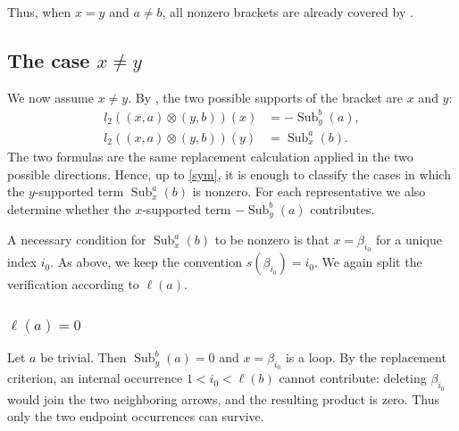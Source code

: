 \documentclass[11pt,a4paper,reqno]{amsart}
\newcommand{\Sub}{\operatorname{Sub}}
\newcommand{\para}[2]{(#1,#2)}
\newcommand{\bi}{\beta_{i_0}}
\theoremstyle{plain}
\theoremstyle{definition}
\numberwithin{equation}{section}
\begin{document}
	Thus, when $x=y$ and $a\neq b$, all nonzero brackets are already covered by
	.
	
	\subsection{The case \texorpdfstring{$x\neq y$}{x not equal y}}\label{subsec:degree-zero-xneqy}
	We now assume $x\neq y$.  By , the two possible supports of the
	bracket are $x$ and $y$:
	\begin{align*}
		l_2(\para{x}{a}\otimes \para{y}{b})(x)
		&=-\Sub_y^b(a),\\
		l_2(\para{x}{a}\otimes \para{y}{b})(y)
		&=\Sub_x^a(b).
	\end{align*}
	The two formulas are the same replacement calculation applied in the
	two possible directions.  Hence, up to \eqref{sym}, it is enough to classify
	the cases in which the $y$-supported term $\Sub_x^a(b)$ is nonzero.
	For each representative we also determine whether the $x$-supported term
	$-\Sub_y^b(a)$ contributes.
	
	A necessary condition for $\Sub_x^a(b)$ to be nonzero is that
	$x=\bi$ for a unique index $i_0$.  As above, we keep the convention
	$s(\bi)=i_0$.  We again split the verification according to $\ell(a)$.
	
	\subsubsection{$\ell(a)=0$}\label{subsec:xneqy-ella-zero}
	Let $a$ be trivial.  Then $\Sub_y^b(a)=0$ and
	$x=\bi$ is a loop.  By the replacement criterion, an internal occurrence
	$1<i_0<\ell(b)$ cannot contribute: deleting $\bi$ would join the two
	neighboring arrows, and the resulting product is zero.  Thus only the two
	endpoint occurrences can survive.
	
\end{document}
